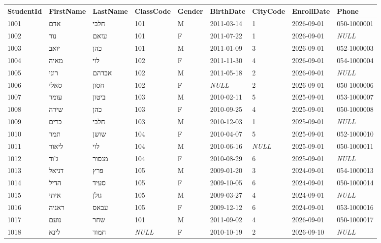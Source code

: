 \documentclass[11pt,a4paper]{article}
\newcommand{\thd}[1]{\textbf{#1}}
\newenvironment{fulltable}[3]{%
  \needspace{5\baselineskip}\par\addvspace{7pt}%
  \noindent{\small הטבלה \babelsublr{\texttt{\textbf{#1}}} \textendash\ #2 שורות#3}\par\vspace{2pt}%
  \begin{otherlanguage}{english}\begin{adjustbox}{max width=\linewidth}}
  {\end{adjustbox}\end{otherlanguage}\par\addvspace{4pt}}
\begin{document}
\begin{fulltable}{Students}{18}{}
\begin{tabular}{lllllllll}
\toprule
\thd{StudentId} & \thd{FirstName} & \thd{LastName} & \thd{ClassCode} & \thd{Gender} & \thd{BirthDate} & \thd{CityCode} & \thd{EnrollDate} & \thd{Phone} \\
\midrule
1001 & אדם & חלבי & 101 & M & 2011-03-14 & 1 & 2026-09-01 & 050-1000001 \\
1002 & נור & עזאם & 101 & F & 2011-07-22 & 1 & 2026-09-01 & \textit{NULL} \\
1003 & יואב & כהן & 101 & M & 2011-01-09 & 3 & 2026-09-01 & 052-1000003 \\
1004 & מאיה & לוי & 102 & F & 2011-11-30 & 4 & 2026-09-01 & 054-1000004 \\
1005 & רוני & אברהם & 102 & M & 2011-05-18 & 2 & 2026-09-01 & \textit{NULL} \\
1006 & סאלי & חסון & 102 & F & \textit{NULL} & 2 & 2026-09-01 & 050-1000006 \\
1007 & עומר & ביטון & 103 & M & 2010-02-11 & 5 & 2025-09-01 & 053-1000007 \\
1008 & שירה & כהן & 103 & F & 2010-09-25 & 4 & 2025-09-01 & 050-1000008 \\
1009 & כרים & חלבי & 103 & M & 2010-12-03 & 1 & 2025-09-01 & \textit{NULL} \\
1010 & תמר & שושן & 104 & F & 2010-04-07 & 5 & 2025-09-01 & 052-1000010 \\
1011 & ליאור & לוי & 104 & M & 2010-06-16 & \textit{NULL} & 2025-09-01 & 050-1000011 \\
1012 & ג'וד & מנסור & 104 & F & 2010-08-29 & 6 & 2025-09-01 & \textit{NULL} \\
1013 & דניאל & פרץ & 105 & M & 2009-01-20 & 3 & 2024-09-01 & 054-1000013 \\
1014 & הדיל & סעיד & 105 & F & 2009-10-05 & 6 & 2024-09-01 & 050-1000014 \\
1015 & איתי & גולן & 105 & M & 2009-03-27 & 4 & 2024-09-01 & \textit{NULL} \\
1016 & ראניה & עבאס & 105 & F & 2009-12-12 & 6 & 2024-09-01 & 053-1000016 \\
1017 & נועם & שחר & 101 & M & 2011-09-02 & 4 & 2026-09-01 & 050-1000017 \\
1018 & לינא & חמוד & \textit{NULL} & F & 2010-10-19 & 2 & 2026-09-10 & \textit{NULL} \\
\bottomrule
\end{tabular}
\end{fulltable}
\end{document}
